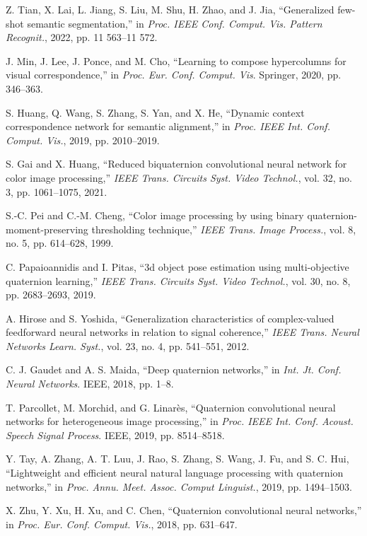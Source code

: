 \documentclass[lettersize,journal]{IEEEtran}
\begin{document}
\begin{thebibliography}{10}
Z. Tian, X. Lai, L. Jiang, S. Liu, M. Shu, H. Zhao, and J. Jia, “Generalized few-shot semantic segmentation,” in \textit{Proc. IEEE Conf. Comput. Vis. Pattern Recognit.}, 2022, pp. 11 563–11 572.

J. Min, J. Lee, J. Ponce, and M. Cho, “Learning to compose hypercolumns for visual correspondence,” in \textit{Proc. Eur. Conf. Comput. Vis}. Springer, 2020, pp. 346–363.

S. Huang, Q. Wang, S. Zhang, S. Yan, and X. He, “Dynamic context correspondence network for semantic alignment,” in \textit{Proc. IEEE Int. Conf. Comput. Vis.}, 2019, pp. 2010–2019.

S. Gai and X. Huang, “Reduced biquaternion convolutional neural network for color image processing,” \textit{IEEE Trans. Circuits Syst. Video Technol.}, vol. 32, no. 3, pp. 1061–1075, 2021.

S.-C. Pei and C.-M. Cheng, “Color image processing by using binary quaternion-moment-preserving thresholding technique,” \textit{IEEE Trans. Image Process.}, vol. 8, no. 5, pp. 614–628, 1999.

C. Papaioannidis and I. Pitas, “3d object pose estimation using multi-objective quaternion learning,” \textit{IEEE Trans. Circuits Syst. Video Technol.}, vol. 30, no. 8, pp. 2683–2693, 2019.

A. Hirose and S. Yoshida, “Generalization characteristics of complex-valued feedforward neural networks in relation to signal coherence,” \textit{IEEE Trans. Neural Networks Learn. Syst.}, vol. 23, no. 4, pp. 541–551, 2012.

C. J. Gaudet and A. S. Maida, “Deep quaternion networks,” in \textit{Int. Jt. Conf. Neural Networks}. IEEE, 2018, pp. 1–8.

T. Parcollet, M. Morchid, and G. Linarès, “Quaternion convolutional neural networks for heterogeneous image processing,” in \textit{Proc. IEEE Int. Conf. Acoust. Speech Signal Process}. IEEE, 2019, pp. 8514–8518.

Y. Tay, A. Zhang, A. T. Luu, J. Rao, S. Zhang, S. Wang, J. Fu, and S. C. Hui, “Lightweight and efficient neural natural language processing with quaternion networks,” in \textit{Proc. Annu. Meet. Assoc. Comput Linguist.}, 2019, pp. 1494–1503.

X. Zhu, Y. Xu, H. Xu, and C. Chen, “Quaternion convolutional neural networks,” in \textit{Proc. Eur. Conf. Comput. Vis.}, 2018, pp. 631–647.


\end{thebibliography}
\end{document}
